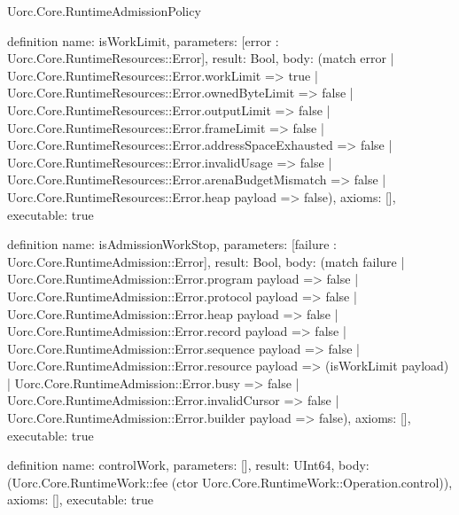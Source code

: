 \begin{lexlean}{Uorc.Core.RuntimeAdmissionPolicy}
\begin{semanticmodule}
definition{
  name: isWorkLimit,
  parameters: [error : Uorc.Core.RuntimeResources::Error],
  result: Bool,
  body: (match error
    | Uorc.Core.RuntimeResources::Error.workLimit => true
    | Uorc.Core.RuntimeResources::Error.ownedByteLimit => false
    | Uorc.Core.RuntimeResources::Error.outputLimit => false
    | Uorc.Core.RuntimeResources::Error.frameLimit => false
    | Uorc.Core.RuntimeResources::Error.addressSpaceExhausted => false
    | Uorc.Core.RuntimeResources::Error.invalidUsage => false
    | Uorc.Core.RuntimeResources::Error.arenaBudgetMismatch => false
    | Uorc.Core.RuntimeResources::Error.heap payload => false),
  axioms: [],
  executable: true
}

definition{
  name: isAdmissionWorkStop,
  parameters: [failure : Uorc.Core.RuntimeAdmission::Error],
  result: Bool,
  body: (match failure
    | Uorc.Core.RuntimeAdmission::Error.program payload => false
    | Uorc.Core.RuntimeAdmission::Error.protocol payload => false
    | Uorc.Core.RuntimeAdmission::Error.heap payload => false
    | Uorc.Core.RuntimeAdmission::Error.record payload => false
    | Uorc.Core.RuntimeAdmission::Error.sequence payload => false
    | Uorc.Core.RuntimeAdmission::Error.resource payload => (isWorkLimit payload)
    | Uorc.Core.RuntimeAdmission::Error.busy => false
    | Uorc.Core.RuntimeAdmission::Error.invalidCursor => false
    | Uorc.Core.RuntimeAdmission::Error.builder payload => false),
  axioms: [],
  executable: true
}

definition{
  name: controlWork,
  parameters: [],
  result: UInt64,
  body: (Uorc.Core.RuntimeWork::fee (ctor Uorc.Core.RuntimeWork::Operation.control)),
  axioms: [],
  executable: true
}


\end{semanticmodule}
\end{lexlean}
